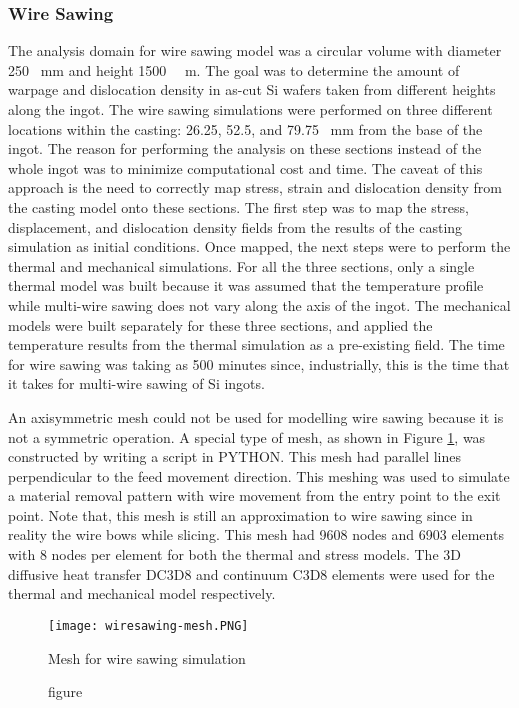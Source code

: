 \subsubsection{Wire Sawing}
The analysis domain for wire sawing model was a circular volume with diameter 250 \SI{}{mm} and height 1500 \SI{}{\micro.m}. The goal was to determine the amount of warpage and dislocation density in as-cut Si wafers taken from different heights along the ingot. The wire sawing simulations were performed on three different locations within the casting: 26.25, 52.5, and 79.75 \SI{}{mm} from the base of the ingot. The reason for performing the analysis on these sections instead of the whole ingot was to minimize computational cost and time. The caveat of this approach is the need to correctly map stress, strain and dislocation density from the casting model onto these sections. The first step was to map the stress, displacement, and dislocation density fields from the results of the casting simulation as initial conditions. Once mapped, the next steps were to perform the thermal and mechanical simulations. For all the three sections, only a single thermal model was built because it was assumed that the temperature profile while multi-wire sawing does not vary along the axis of the ingot. The mechanical models were built separately for these three sections, and applied the temperature results from the thermal simulation as a pre-existing field. The time for wire sawing was taking as 500 minutes since, industrially, this is the time that it takes for multi-wire sawing of Si ingots.  

An axisymmetric mesh could not be used for modelling wire sawing because it is not a symmetric operation. A special type of mesh, as shown in Figure \ref{fig:wiresawing-mesh}, was constructed by writing a script in PYTHON. This mesh had parallel lines perpendicular to the feed movement direction. This meshing was used to simulate a material removal pattern with wire movement from the entry point to the exit point. Note that, this mesh is still an approximation to wire sawing since in reality the wire bows while slicing. This mesh had 9608 nodes and 6903 elements with 8 nodes per element for both the thermal and stress models. The 3D diffusive heat transfer DC3D8 and continuum C3D8 elements were used for the thermal and mechanical model respectively.

\begin{figure}
    \centering
    \texttt{[image: wiresawing-mesh.PNG]}
    \caption{figure}{Mesh for wire sawing simulation}
    \label{fig:wiresawing-mesh}
\end{figure}


